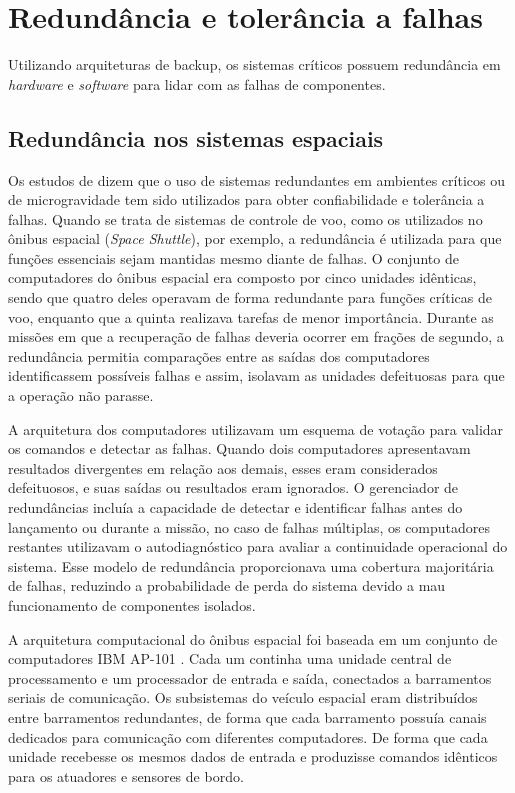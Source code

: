 \section{Redundância e tolerância a falhas}

Utilizando arquiteturas de backup, os sistemas críticos possuem redundância em \emph{hardware} e \emph{software} para lidar com as falhas de componentes.

\subsection{Redundância nos sistemas espaciais }

Os estudos de \cite{sklaroff1976} dizem que o uso de sistemas redundantes em ambientes críticos ou de microgravidade tem sido utilizados para obter confiabilidade e tolerância a falhas.
Quando se trata de sistemas de controle de voo, como os utilizados no ônibus espacial (\emph{Space Shuttle}), por exemplo, a redundância é utilizada para que funções essenciais sejam mantidas mesmo diante de falhas.
O conjunto de computadores do ônibus espacial era composto por cinco unidades idênticas, sendo que quatro deles operavam de forma redundante para funções críticas de voo, enquanto que a quinta realizava tarefas de menor importância.
Durante as missões em que a recuperação de falhas deveria ocorrer em frações de segundo, a redundância permitia comparações entre as saídas dos computadores identificassem possíveis falhas e assim, isolavam as unidades defeituosas para que a operação não parasse.

A arquitetura dos computadores utilizavam um esquema de votação para validar os comandos e detectar as falhas.
Quando dois computadores apresentavam resultados divergentes em relação aos demais, esses eram considerados defeituosos, e suas saídas ou resultados eram ignorados.
O gerenciador de redundâncias incluía a capacidade de detectar e identificar falhas antes do lançamento ou durante a missão, no caso de falhas múltiplas, os computadores restantes utilizavam o autodiagnóstico para avaliar a continuidade operacional do sistema.
Esse modelo de redundância proporcionava uma cobertura majoritária de falhas, reduzindo a probabilidade de perda do sistema devido a mau funcionamento de componentes isolados.

A arquitetura computacional do ônibus espacial foi baseada em um conjunto de computadores IBM AP-101 \cite{ibm_space_shuttle}. Cada um continha uma unidade central de processamento e um processador de entrada e saída, conectados a barramentos seriais de comunicação.
Os subsistemas do veículo espacial eram distribuídos entre barramentos redundantes, de forma que cada barramento possuía canais dedicados para comunicação com diferentes computadores.
De forma que cada unidade recebesse os mesmos dados de entrada e produzisse comandos idênticos para os atuadores e sensores de bordo.

